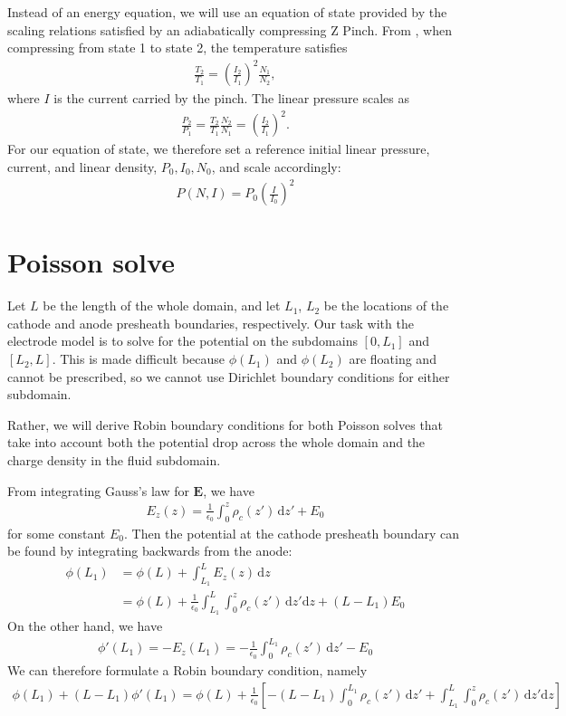 \documentclass{article}
\begin{document}
Instead of an energy equation, we will use an equation of state provided by the scaling relations
satisfied by an adiabatically compressing Z Pinch.
From \cite{shumlakShearedFlowStabilizedZPinch2012}, when compressing from state 1 to state 2, the temperature satisfies
\begin{align*}
\frac{T_2}{T_1} = \left( \frac{I_2}{I_1} \right)^2 \frac{N_1}{N_2},
\end{align*}
where $I$ is the current carried by the pinch.
The linear pressure scales as
\begin{align*}
    \frac{P_2}{P_1} = \frac{T_2}{T_1} \frac{N_2}{N_1} = \left( \frac{I_2}{I_1} \right)^2.
\end{align*}
For our equation of state, we therefore set a reference initial linear pressure, current, and linear density, $P_0, I_0, N_0$, and scale accordingly:
\begin{align*}
    P(N, I) = P_0 \left( \frac{I}{I_0} \right)^{2}
\end{align*}

\section{Poisson solve}

Let $L$ be the length of the whole domain, and let $L_1$, $L_2$ be the locations of the cathode and anode presheath boundaries,
respectively. Our task with the electrode model is to solve for the potential on the subdomains $[0, L_1]$ and $[L_2, L]$.
This is made difficult because $\phi(L_1)$ and $\phi(L_2)$ are floating and cannot be prescribed, so we cannot use Dirichlet
boundary conditions for either subdomain.

Rather, we will derive Robin boundary conditions for both Poisson solves that take into account both the potential drop across
the whole domain and the charge density in the fluid subdomain.

From integrating Gauss's law for $\bm{E}$, we have
\begin{align*}
E_z(z) = \frac{1}{\epsilon_0}\int_0^z \rho_c(z') \, \mathrm{d} z' + E_0
\end{align*}
for some constant $E_0$.
Then the potential at the cathode presheath boundary can be found by integrating
backwards from the anode:
\begin{align*}
    \phi(L_1) &= \phi(L) + \int_{L_1}^L E_z(z) \, \mathrm{d} z \\
              &= \phi(L) + \frac{1}{\epsilon_0} \int_{L_1}^L \int_0^z \rho_c(z') \, \mathrm{d} z' \mathrm{d} z + (L - L_1) E_0
\end{align*}
On the other hand, we have
\begin{align*}
    \phi'(L_1) = -E_z(L_1) = -\frac{1}{\epsilon_0} \int_0^{L_1} \rho_c(z') \, \mathrm{d} z' - E_0
\end{align*}
We can therefore formulate a Robin boundary condition, namely
\begin{align*}
    \phi(L_1) + (L - L_1) \phi'(L_1) = \phi(L) + \frac{1}{\epsilon_0} \left[ -(L-L_1) \int_0^{L_1} \rho_c(z') \, \mathrm{d} z' + \int_{L_1}^L \int_0^z \rho_c(z') \, \mathrm{d} z' \mathrm{d} z \right] 
\end{align*}
\end{document}
